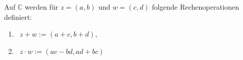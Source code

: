 Auf $\mathbb{C}$ werden für $z = (a, b)$ und $w = (c, d)$ folgende Rechenoperationen definiert:
\begin{enumerate}[label={},leftmargin=0pt]
    \item {} \, $z+w := (a+c, b+d)$,
    \item {} \, $z \cdot w := (ac - bd, ad+bc)$
\end{enumerate}